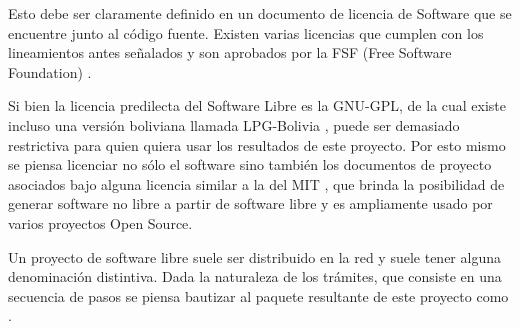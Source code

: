 Esto debe ser claramente definido en un documento de licencia de Software que se
encuentre junto al código fuente. Existen varias licencias que cumplen con los
lineamientos antes señalados y son aprobados por la FSF (Free Software
Foundation) \cite{VariousLicensesComments}.

Si bien la licencia predilecta del Software Libre es la GNU-GPL, de la cual
existe incluso una versión boliviana llamada LPG-Bolivia
\cite{cayoLPGBoliviaADSIB}, puede ser demasiado restrictiva para quien quiera
usar los resultados de este proyecto. Por esto mismo se piensa licenciar no sólo
el software sino también los documentos de proyecto asociados bajo alguna
licencia similar a la del MIT \cite{MITLicense2006}, que brinda la posibilidad
de generar software no libre a partir de software libre y es ampliamente usado
por varios proyectos Open Source.

Un proyecto de software libre suele ser distribuido en la red y suele tener
alguna denominación distintiva. Dada la naturaleza de los trámites, que consiste
en una secuencia de pasos se piensa bautizar al paquete resultante de este
proyecto como .